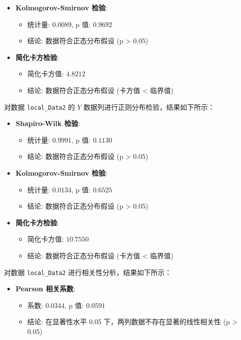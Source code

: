 \begin{enumerate}
\begin{enumerate}
\begin{itemize}
			\item \textbf{Kolmogorov-Smirnov 检验}:
			\begin{itemize}
				\item 统计量: \(0.0089\), p 值: \(0.9692\)
				\item 结论: 数据符合正态分布假设 (p > 0.05)
			\end{itemize}
			
			\item \textbf{简化卡方检验}:
			\begin{itemize}
				\item 简化卡方值: \(4.8212\)
				\item 结论: 数据符合正态分布假设 (卡方值 < 临界值)
			\end{itemize}
		\end{itemize}
		
		对数据 \texttt{local\_Data2} 的 \(Y\) 数据列进行正则分布检验，结果如下所示：
		
		\begin{itemize}
			\item \textbf{Shapiro-Wilk 检验}:
			\begin{itemize}
				\item 统计量: \(0.9991\), p 值: \(0.1130\)
				\item 结论: 数据符合正态分布假设 (p > 0.05)
			\end{itemize}
			
			\item \textbf{Kolmogorov-Smirnov 检验}:
			\begin{itemize}
				\item 统计量: \(0.0134\), p 值: \(0.6525\)
				\item 结论: 数据符合正态分布假设 (p > 0.05)
			\end{itemize}
			
			\item \textbf{简化卡方检验}:
			\begin{itemize}
				\item 简化卡方值: \(10.7550\)
				\item 结论: 数据符合正态分布假设 (卡方值 < 临界值)
			\end{itemize}
		\end{itemize}
		
		对数据 \texttt{local\_Data2} 进行相关性分析，结果如下所示：
		
		\begin{itemize}
			\item \textbf{Pearson 相关系数}:
			\begin{itemize}
				\item 系数: \(0.0344\), p 值: \(0.0591\)
				\item 结论: 在显著性水平 0.05 下，两列数据不存在显著的线性相关性 (p > 0.05)
			\end{itemize}
			

\end{itemize}
\end{enumerate}
\end{enumerate}

